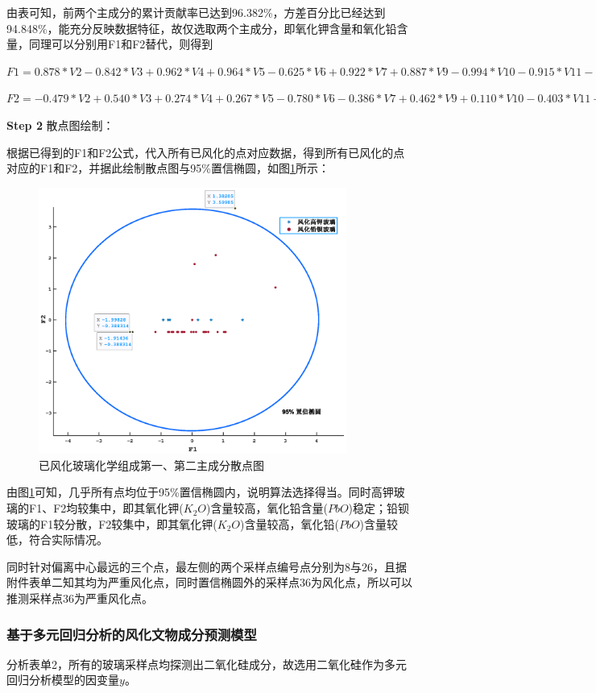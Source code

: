 \documentclass{my_paper}
\begin{document}
由表可知，前两个主成分的累计贡献率已达到96.382\%，方差百分比已经达到94.848\%，能充分反映数据特征，故仅选取两个主成分，即氧化钾含量和氧化铅含量，同理可以分别用F1和F2替代，则得到

$
    F1=0.878*V2-0.842*V3+0.962*V4+0.964*V5-0.625*V6+0.922*V7+0.887*V9-0.994*V10-0.915*V11-0.850*V13$
    
$
    F2=-0.479*V2+0.540*V3+0.274*V4+0.267*V5-0.780*V6-0.386*V7+0.462*V9+0.110*V10-0.403*V11+0.526*V13
$

\textbf{Step 2} 散点图绘制：\par
根据已得到的F1和F2公式，代入所有已风化的点对应数据，得到所有已风化的点对应的F1和F2，并据此绘制散点图与95\%置信椭圆，如图\ref{已风化}所示：
\begin{figure}[H]
\centering
\includegraphics[width=0.9\textwidth]{已风化.eps}
\caption{已风化玻璃化学组成第一、第二主成分散点图}
\label{已风化}
\end{figure}
由图\ref{已风化}可知，几乎所有点均位于95\%置信椭圆内，说明算法选择得当。同时高钾玻璃的F1、F2均较集中，即其氧化钾($K_2O$)含量较高，氧化铅含量($PbO$)稳定；铅钡玻璃的F1较分散，F2较集中，即其氧化钾($K_2O$)含量较高，氧化铅($PbO$)含量较低，符合实际情况。\par
同时针对偏离中心最远的三个点，最左侧的两个采样点编号点分别为8与26，且据附件表单二知其均为严重风化点，同时置信椭圆外的采样点36为风化点，所以可以推测采样点36为严重风化点。
\subsubsection{基于多元回归分析的风化文物成分预测模型}
分析表单2，所有的玻璃采样点均探测出二氧化硅成分，故选用二氧化硅作为多元回归分析模型的因变量$y$。
\end{document}
